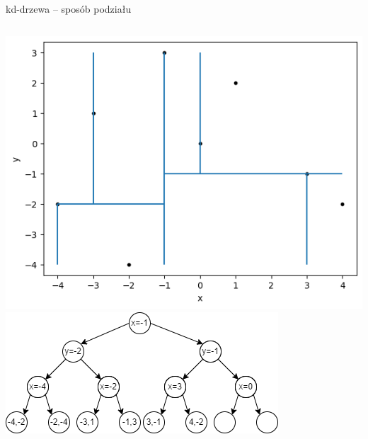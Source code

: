 \documentclass[aspectratio=169,dvipsnames]{beamer}
\begin{document}
\begin{frame}{kd-drzewa -- sposób podziału}
    \begin{columns}
        \includegraphics[width=\textwidth]{images/plots/8}
        \includegraphics[width=\textwidth]{images/trees/11.drawio}
    \end{columns}
\end{frame}
\end{document}
